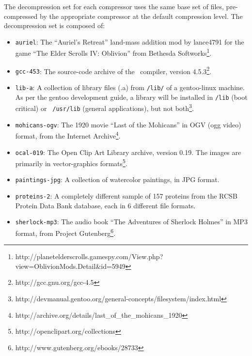 The decompression set for each compressor uses the same base set of
files, pre-compressed by the appropriate compressor at the default
compression level.  The decompression set is composed of:
\begin{itemize}
\item {\tt auriel}: The ``Auriel's Retreat'' land-mass addition mod by
  lance4791 for the game ``The Elder Scrolls IV: Oblivion'' from
  Bethesda
  Softworks\footnote{http://planetelderscrolls.gamespy.com/View.php?view=OblivionMods.Detail\&id=5949}.

\item {\tt gcc-453}: The source-code archive of the \gcc\ compiler,
  version 4.5.3\footnote{http://gcc.gnu.org/gcc-4.5}.

\item {\tt lib-a}: A collection of library files (.a) from {\tt /lib/} of a
  gentoo-linux machine.  As per the gentoo development guide, a
  library will be installed in {\tt /lib} (boot critical) or {\tt
    /usr/lib} (general applications), but not both\footnote{
    http://devmanual.gentoo.org/general-concepts/filesystem/index.html}.

\item {\tt mohicans-ogv}: The 1920 movie ``Last of the Mohicans'' in OGV
  (ogg video) format, from the Internet
  Archive\footnote{http://archive.org/details/last\_of\_the\_mohicans\_1920}.

\item {\tt ocal-019}: The Open Clip Art Library archive, version 0.19.  The
  images are primarily in vector-graphics
  formats\footnote{http://openclipart.org/collections}.

\item {\tt paintings-jpg}: A collection of watercolor paintings, in JPG format.

\item {\tt proteins-2}: A completely different sample of 157 proteins from
  the RCSB Protein Data Bank database, each in 6 different file
  formats.

\item {\tt sherlock-mp3}: The audio book ``The Adventures of Sherlock
  Holmes'' in MP3 format, from Project
  Gutenberg\footnote{http://www.gutenberg.org/ebooks/28733}.

\end{itemize}
